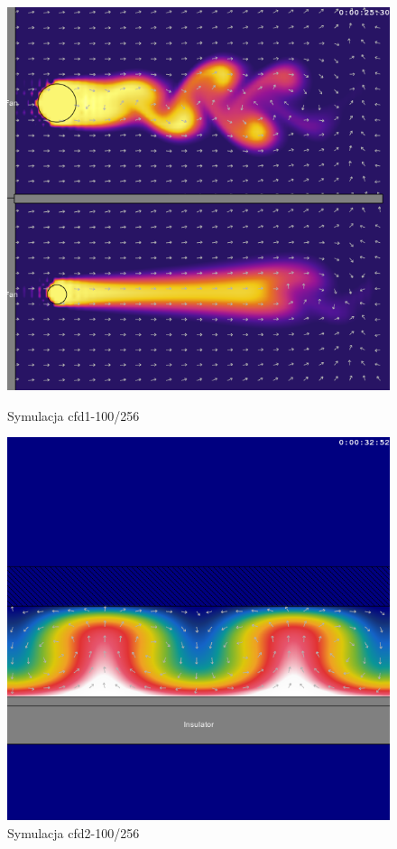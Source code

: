 \begin{figure}[!p]
\begin{minipage}[b]{0.47\linewidth}
\centering
\includegraphics[width=\textwidth]{img/perfCase/cfd1}
\caption{Symulacja cfd1-100/256}
\label{fig:cfd1}
\end{minipage}
\hspace{0.04\linewidth}
\begin{minipage}[b]{0.47\linewidth}
\centering
\includegraphics[width=\textwidth]{img/perfCase/cfd2}
\caption{Symulacja cfd2-100/256}
\label{fig:cfd2}
\end{minipage}
\end{figure}

